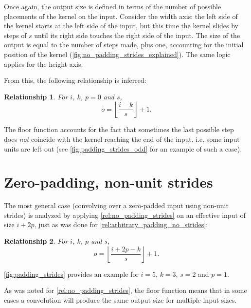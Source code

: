 \documentclass{report}
\newtheorem{relationship}{Relationship}
\begin{document}
Once again, the output size is defined in terms of the number of possible
placements of the kernel on the input. Consider the width axis: the left side of
the kernel starts at the left side of the input, but this time the kernel slides
by steps of $s$ until its right side touches the right side of the input. The
size of the output is equal to the number of steps made, plus one, accounting
for the initial position of the kernel
(\autoref{fig:no_padding_strides_explained}). The same logic applies for the
height axis.

From this, the following relationship is inferred:

\begin{relationship}\label{rel:no_padding_strides}
For $i$, $k$, $p = 0$ and $s$,
\begin{equation*}
    o = \left\lfloor \frac{i - k}{s} \right\rfloor + 1.
\end{equation*}
\end{relationship}

The floor function accounts for the fact that sometimes the last possible step
does {\em not} coincide with the kernel reaching the end of the input, i.e.
some input units are left out (see \autoref{fig:padding_strides_odd} for an
example of such a case).

\section{Zero-padding, non-unit strides}

The most general case (convolving over a zero-padded input using non-unit
strides) is analyzed by applying \autoref{rel:no_padding_strides} on an
effective input of size $i + 2p$, just as was done for
\autoref{rel:arbitrary_padding_no_strides}:

\begin{relationship}\label{rel:padding_strides}
For $i$, $k$, $p$ and $s$,
\begin{equation*}
    o = \left\lfloor \frac{i + 2p - k}{s} \right\rfloor + 1.
\end{equation*}
\end{relationship}

\autoref{fig:padding_strides} provides an example for $i = 5$, $k = 3$, $s = 2$
and $p = 1$.

As was noted for \autoref{rel:no_padding_strides}, the floor function means
that in some cases a convolution will produce the same output size for multiple
input sizes.
\end{document}
